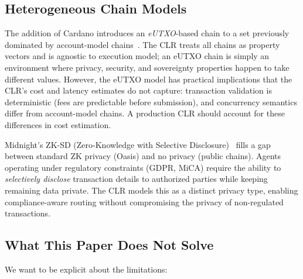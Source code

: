 \documentclass[conference, 10pt, twocolumn]{IEEEtran}
\begin{document}
\subsection{Heterogeneous Chain Models}

The addition of Cardano introduces an \emph{eUTXO}-based chain to a
set previously dominated by account-model
chains~\cite{cardano2020ouroboros}.  The CLR treats all chains as
property vectors and is agnostic to execution model; an eUTXO chain
is simply an environment where privacy, security, and sovereignty
properties happen to take different values.  However, the eUTXO model
has practical implications that the CLR's cost and latency estimates
do not capture: transaction validation is deterministic (fees are
predictable before submission), and concurrency semantics differ from
account-model chains.  A production CLR should account for these
differences in cost estimation.

Midnight's ZK-SD (Zero-Knowledge with Selective
Disclosure)~\cite{midnight2024} fills a gap between standard ZK
privacy (Oasis) and no privacy (public chains).  Agents operating
under regulatory constraints (GDPR, MiCA) require the ability to
\emph{selectively disclose} transaction details to authorized parties
while keeping remaining data private.  The CLR models this as a
distinct privacy type, enabling compliance-aware routing without
compromising the privacy of non-regulated transactions.

\subsection{What This Paper Does Not Solve}

We want to be explicit about the limitations:
\end{document}

